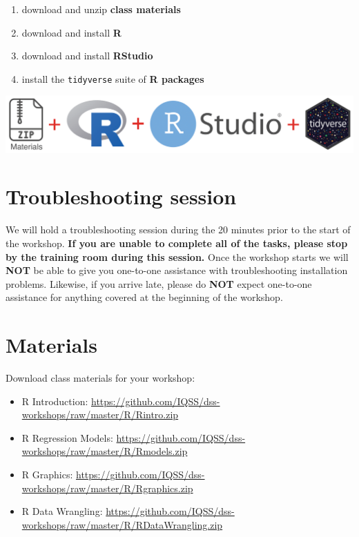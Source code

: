 \documentclass[]{book}
\providecommand{\tightlist}{%
  \setlength{\itemsep}{0pt}\setlength{\parskip}{0pt}}
\begin{document}
\begin{enumerate}
\def\labelenumi{\arabic{enumi}.}
\tightlist
\item
  download and unzip \textbf{class materials}
\item
  download and install \textbf{R}
\item
  download and install \textbf{RStudio}
\item
  install the \texttt{tidyverse} suite of \textbf{R packages}
\end{enumerate}

\includegraphics{R/Rinstall/images/install_software_R.png}

\hypertarget{troubleshooting-session}{%
\section{Troubleshooting session}\label{troubleshooting-session}}

We will hold a troubleshooting session during the 20 minutes prior to the start of the workshop.
\textbf{If you are unable to complete all of the tasks, please stop by the training room during this session.}
Once the workshop starts we will \textbf{NOT} be able to give you one-to-one assistance with troubleshooting installation problems. Likewise, if you arrive late, please do \textbf{NOT} expect one-to-one assistance for anything covered at the beginning of the workshop.

\hypertarget{materials}{%
\section{Materials}\label{materials}}

Download class materials for your workshop:

\begin{itemize}
\tightlist
\item
  R Introduction: \url{https://github.com/IQSS/dss-workshops/raw/master/R/Rintro.zip}
\item
  R Regression Models: \url{https://github.com/IQSS/dss-workshops/raw/master/R/Rmodels.zip}
\item
  R Graphics: \url{https://github.com/IQSS/dss-workshops/raw/master/R/Rgraphics.zip}
\item
  R Data Wrangling: \url{https://github.com/IQSS/dss-workshops/raw/master/R/RDataWrangling.zip}
\end{itemize}
\end{document}
